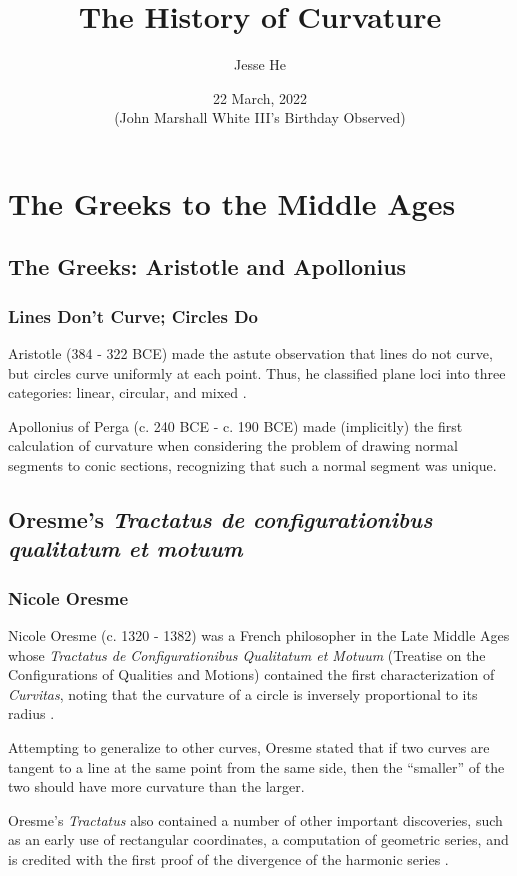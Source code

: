 \documentclass{beamer}
\title{The History of Curvature}
\author{Jesse He}
\institute{OSU Reading Classics}
\date{22 March, 2022\\(John Marshall White III's Birthday Observed)}
\theoremstyle{definition}
\begin{document}
    
\frame{\titlepage}

\section{The Greeks to the Middle Ages}

\subsection{The Greeks: Aristotle and Apollonius}

\begin{frame}
    \frametitle{Lines Don't Curve; Circles Do}

    Aristotle (384 - 322 BCE) made the astute observation that lines do not curve,
    but circles curve uniformly at each point. Thus, he classified
    plane loci into three categories: linear, circular, and mixed \cite{unsat-hist}.

    Apollonius of Perga (c. 240 BCE - c. 190 BCE) made (implicitly) the first
    calculation of curvature when considering the problem of drawing normal
    segments to conic sections, recognizing that such a normal segment was unique.

\end{frame}

\subsection{Oresme's \textit{Tractatus de configurationibus qualitatum et motuum}}

\begin{frame}
    \frametitle{Nicole Oresme}

    Nicole Oresme (c. 1320 - 1382) was a French philosopher in the Late Middle Ages
    whose \textit{Tractatus de Configurationibus Qualitatum et Motuum} (Treatise
    on the Configurations of Qualities and Motions) contained the first characterization
    of \emph{Curvitas}, noting that the curvature of a circle is inversely proportional
    to its radius \cite{unsat-hist}.

    Attempting to generalize to other curves, Oresme stated that if two curves are tangent
    to a line at the same point from the same side, then the ``smaller'' of the two should
    have more curvature than the larger.

    Oresme's \emph{Tractatus} also contained a number of other important discoveries,
    such as an early use of rectangular coordinates, a computation of geometric series,
    and is credited with the first proof of the divergence of the harmonic
    series \cite{sep-nicole-oresme}.
\end{frame}
\end{document}
